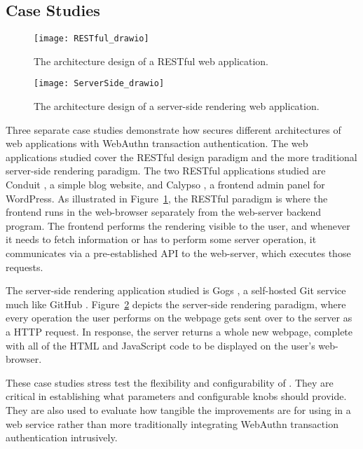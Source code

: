 \subsection{Case Studies}

\begin{figure}[h]
  \centering
  \texttt{[image: RESTful\_drawio]}
  \caption{The architecture design of a RESTful web application.}
  \label{Fig:CaseStudiesRESTful}
\end{figure}

\begin{figure}[h]
  \centering
  \texttt{[image: ServerSide\_drawio]}
  \caption{The architecture design of a server-side rendering web application.}
  \label{Fig:CaseStudiesServerSide}
\end{figure}

Three separate case studies demonstrate how \sys{} secures different architectures of web applications with WebAuthn transaction authentication. The web applications studied cover the RESTful design paradigm and the more traditional server-side rendering paradigm. The two RESTful applications studied are Conduit \cite{conduit}, a simple blog website, and Calypso \cite{calypso}, a frontend admin panel for WordPress. As illustrated in Figure~\ref{Fig:CaseStudiesRESTful}, the RESTful paradigm is where the frontend runs in the web-browser separately from the web-server backend program. The frontend performs the rendering visible to the user, and whenever it needs to fetch information or has to perform some server operation, it communicates via a pre-established API to the web-server, which executes those requests. 

The server-side rendering application studied is Gogs \cite{gogs}, a self-hosted Git service much like GitHub \cite{github}. Figure~\ref{Fig:CaseStudiesServerSide} depicts the server-side rendering paradigm, where every operation the user performs on the webpage gets sent over to the server as a HTTP request. In response, the server returns a whole new webpage, complete with all of the HTML and JavaScript code to be displayed on the user's web-browser.


These case studies stress test the flexibility and configurability of \sys{}. They are critical in establishing what parameters and configurable knobs \sys{} should provide. They are also used to evaluate how tangible the improvements are for using \sys{} in a web service rather than more traditionally integrating WebAuthn transaction authentication intrusively. 

